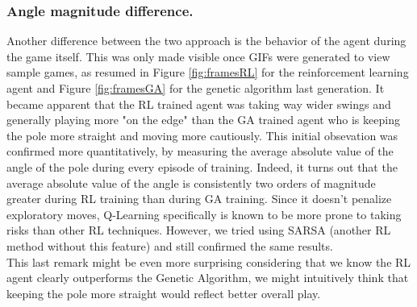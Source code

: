 \subsubsection{Angle magnitude difference.}
Another difference between the two approach is the behavior of the agent during the game itself.
This was only made visible once GIFs were generated to view sample games, as resumed in Figure \ref{fig:framesRL} for the reinforcement learning agent and Figure \ref{fig:framesGA} for the genetic algorithm last generation. 
It became apparent that the RL trained agent was taking way wider swings and generally playing more "on the edge" than the GA trained agent who is keeping the pole more straight and moving more cautiously.
This initial obsevation was confirmed more quantitatively, by measuring the average absolute value of the angle of the pole during every episode of training.
Indeed, it turns out that the average absolute value of the angle is consistently two orders of magnitude greater during RL training than during GA training.
Since it doesn't penalize exploratory moves, Q-Learning specifically is known to be more prone to taking risks than other RL techniques. However, we tried using SARSA (another RL method without this feature) and still confirmed the same results.
\\
This last remark might be even more surprising considering that we know the RL agent clearly outperforms the Genetic Algorithm, we might intuitively think that keeping the pole more straight would reflect better overall play.


